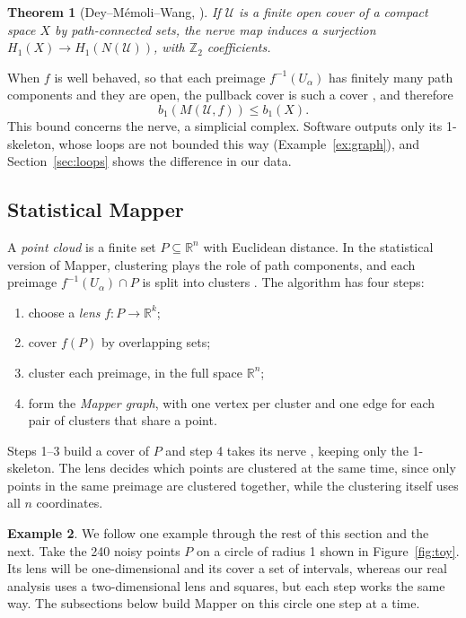 \documentclass{article}
\newcommand{\R}{\mathbb{R}}
\newcommand{\Z}{\mathbb{Z}}
\newtheorem{theorem}{Theorem}[section]
\theoremstyle{definition}
\newtheorem{example}[theorem]{Example}
\theoremstyle{remark}
\begin{document}
\begin{theorem}[Dey--M\'emoli--Wang, {\cite{deymemoliwang2017}}]\label{thm:dmw}
If $\mathcal U$ is a finite open cover of a compact space $X$ by path-connected sets, the nerve map induces a surjection $H_1(X) \to H_1(N(\mathcal U))$, with $\Z_2$ coefficients.
\end{theorem}
When $f$ is well behaved, so that each preimage $f^{-1}(U_\alpha)$ has finitely many path components and they are open, the pullback cover is such a cover \parencite{deymemoliwang2017}, and therefore
\begin{equation}\label{eq:mapper-b1}
  b_1(M(\mathcal U, f)) \le b_1(X).
\end{equation}
This bound concerns the nerve, a simplicial complex. Software outputs only its 1-skeleton, whose loops are not bounded this way (Example~\ref{ex:graph}), and Section~\ref{sec:loops} shows the difference in our data.

\subsection{Statistical Mapper}
A \emph{point cloud} is a finite set $P \subseteq \R^n$ with Euclidean distance.
In the statistical version of Mapper, clustering plays the role of path components, and each preimage $f^{-1}(U_\alpha) \cap P$ is split into clusters \parencite{singh2007mapper}.
The algorithm has four steps:
\begin{enumerate}
  \item choose a \emph{lens} $f : P \to \R^k$;
  \item cover $f(P)$ by overlapping sets;
  \item cluster each preimage, in the full space $\R^n$;
  \item form the \emph{Mapper graph}, with one vertex per cluster and one edge for each pair of clusters that share a point.
\end{enumerate}
Steps 1--3 build a cover of $P$ and step 4 takes its nerve \parencite{singh2007mapper}, keeping only the 1-skeleton.
The lens decides which points are clustered at the same time, since only points in the same preimage are clustered together, while the clustering itself uses all $n$ coordinates.

\begin{example}\label{ex:toy}
We follow one example through the rest of this section and the next.
Take the 240 noisy points $P$ on a circle of radius 1 shown in Figure~\ref{fig:toy}.
Its lens will be one-dimensional and its cover a set of intervals, whereas our real analysis uses a two-dimensional lens and squares, but each step works the same way.
The subsections below build Mapper on this circle one step at a time.
\end{example}
\end{document}
